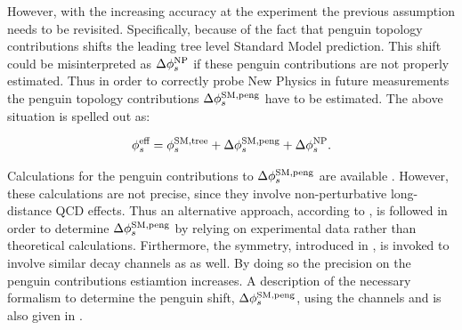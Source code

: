 However, with the increasing accuracy at the \lhcb experiment the previous assumption needs to be revisited.
Specifically, because of the fact that penguin topology contributions shifts the leading tree level Standard Model prediction.
This shift could be misinterpreted as $\Delta\phi_{s}^{\tiny\text{NP}}$ if these penguin contributions are not properly estimated.
Thus in order to correctly probe New Physics in future measurements the penguin topology contributions $\Delta\phi_{s}^{\tiny\text{SM,peng}}$
have to be estimated. The above situation is spelled out as:

\begin{equation}
\centering
 \phis^{\text {eff}} = \phis^{\tiny \text{SM,tree}} + \Delta\phiS{SM,peng} + \Delta\phis^{\tiny \text{NP}}.
 \label{phis_sm_peng}
\end{equation}

\noindent Calculations for the penguin contributions to $\Delta\phi_{s}^{\tiny\text{SM,peng}}$ are available \cite{Liu:2013nea,Frings:2015eva}.
However, these calculations are not precise, since they involve non-perturbative long-distance QCD effects. Thus an alternative
approach, according to \cite{DeBruyn:2014oga,Frings:2015eva,Faller:2008gt,Liu:2013nea,DeBruyn-thesis}, is followed in order to
determine $\Delta\phi_{s}^{\tiny\text{SM,peng}}$ by relying on experimental data rather than theoretical calculations.
Firthermore, the \grpsuthree symmetry, introduced in , is invoked to involve similar decay channels as \BsJpsiPhi as well.
By doing so the precision on the penguin contributions estiamtion increases. A description of the necessary formalism to determine
the penguin shift, $\Delta\phi_{s}^{\tiny\text{SM,peng}}$, using the channels \BsJpsiKst and \BsJpsiRho is also given in .
